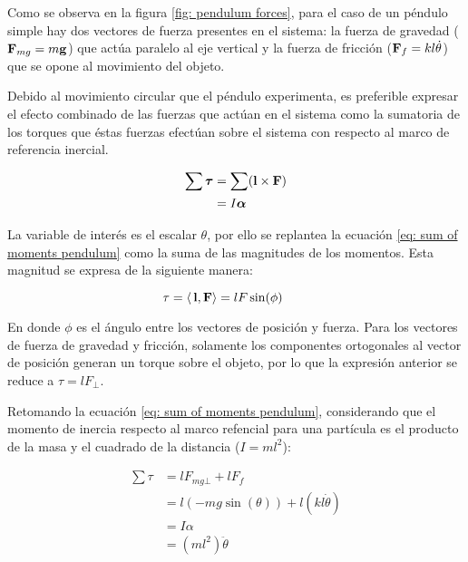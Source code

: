 Como se observa en la figura \ref{fig: pendulum forces}, 
para el caso de un péndulo simple 
hay dos vectores de fuerza presentes en el sistema:
la fuerza de gravedad ($\bold{F}_{mg} = m\bold{g}$) que actúa paralelo al eje vertical 
y la fuerza de fricción ($\bold{F}_f = kl\dot{\theta}$) que se opone al movimiento del objeto. 

Debido al movimiento circular que el péndulo experimenta,
es preferible expresar el efecto combinado
de las fuerzas que actúan en el sistema como
la sumatoria de los torques que éstas fuerzas
efectúan sobre el sistema con respecto al marco de
referencia inercial.

\begin{equation}
 \begin{split}
  \sum\boldsymbol{\tau} & = \sum (\bold{l} \times \bold{F})\\
  & = I \boldsymbol{\alpha}
 \end{split}
 \label{eq: sum of moments pendulum}
\end{equation}

La variable de interés es el escalar $\theta$, por ello
se replantea la ecuación \eqref{eq: sum of moments pendulum}
como la suma de las magnitudes de los momentos.
Esta magnitud se expresa de la siguiente manera:

\begin{equation}
 \tau =  \langle \, \bold{l} , \bold{F}\rangle=  l F \sin(\phi) \qquad 
\end{equation}

En donde $\phi$ es el ángulo entre los vectores de posición y fuerza. 
Para los vectores de fuerza de gravedad y fricción,
solamente los componentes ortogonales al vector de posición generan
un torque sobre el objeto, por lo que la expresión anterior se reduce a 
$\tau = l F_\bot$.

Retomando la ecuación \eqref{eq: sum of moments pendulum}, considerando 
que el momento de inercia respecto al marco refencial para una partícula es 
el producto de la masa y el cuadrado de la distancia ($ I = m l^2$):

\begin{equation}
\begin{split}
 \sum \tau &= l F_{mg\bot}  + l F_f\\
 & = l (-m g \sin(\theta))  + l (k l \dot{\theta})\\
 & = I \alpha \\
 & = (m l^2) \ddot{\theta}
 \end{split}
 \label{eq: sum of moments magnitude}
\end{equation}

